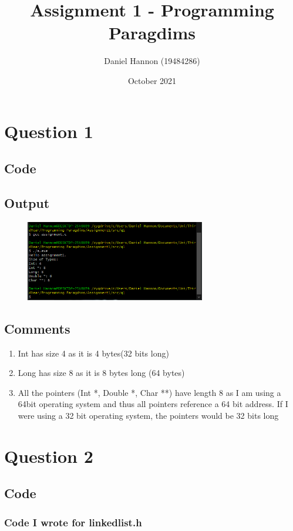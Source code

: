 \documentclass{article}
\title{Assignment 1 - Programming Paragdims}
\author{Daniel Hannon (19484286)}
\date{October 2021}
\begin{document}
	\maketitle
	\section{Question 1}
		\subsection{Code}
		\subsection{Output}
			\begin{figure}[h!]
				\centering
				\includegraphics[width=0.7\textwidth]{1.png}
			\end{figure}
		\subsection{Comments}
			\begin{enumerate}
				\item Int has size 4 as it is 4 bytes(32 bits long)
				\item Long has size 8 as it is 8 bytes long (64 bytes)
				\item All the pointers (Int *, Double *, Char **) have length 8 as I am using a 64bit operating system and thus all pointers reference a 64 bit address. If I were using a 32 bit operating system, the pointers would be 32 bits long
			\end{enumerate}
	\section{Question 2}
		\subsection{Code}
			\subsubsection{Code I wrote for linkedlist.h}
				\newpage
\end{document}
